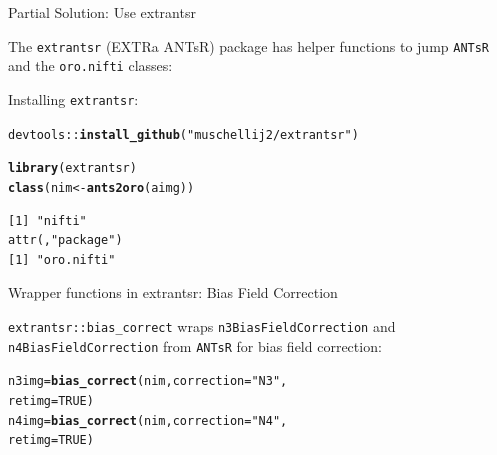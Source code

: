 \documentclass[11pt]{beamer}\usepackage[]{graphicx}\usepackage[]{color}
\makeatletter
\newcommand{\hlnum}[1]{\textcolor[rgb]{0.686,0.059,0.569}{#1}}%
\newcommand{\hlstr}[1]{\textcolor[rgb]{0.192,0.494,0.8}{#1}}%
\newcommand{\hlopt}[1]{\textcolor[rgb]{0,0,0}{#1}}%
\newcommand{\hlstd}[1]{\textcolor[rgb]{0.345,0.345,0.345}{#1}}%
\newcommand{\hlkwb}[1]{\textcolor[rgb]{0.69,0.353,0.396}{#1}}%
\newcommand{\hlkwc}[1]{\textcolor[rgb]{0.333,0.667,0.333}{#1}}%
\newcommand{\hlkwd}[1]{\textcolor[rgb]{0.737,0.353,0.396}{\textbf{#1}}}%
\newenvironment{kframe}{%
 \def\at@end@of@kframe{}%
 \ifinner\ifhmode%
  \def\at@end@of@kframe{\end{minipage}}%
  \begin{minipage}{\columnwidth}%
 \fi\fi%
 \def\FrameCommand##1{\hskip\@totalleftmargin \hskip-\fboxsep
 \colorbox{shadecolor}{##1}\hskip-\fboxsep
     \hskip-\linewidth \hskip-\@totalleftmargin \hskip\columnwidth}%
 \MakeFramed {\advance\hsize-\width
   \@totalleftmargin\z@ \linewidth\hsize
   \@setminipage}}%
 {\par\unskip\endMakeFramed%
 \at@end@of@kframe}
\newenvironment{knitrout}{}{} %
\makeatother
\begin{document}
\begin{frame}[fragile]{Partial Solution: Use extrantsr}

The \verb|extrantsr| (EXTRa ANTsR) package has helper functions to jump \verb|ANTsR| and the \verb|oro.nifti| classes:

Installing \verb|extrantsr|:
\begin{knitrout}
\color{fgcolor}\begin{kframe}
\begin{alltt}
\hlstd{devtools}\hlopt{::}\hlkwd{install_github}\hlstd{(}\hlstr{"muschellij2/extrantsr"}\hlstd{)}
\end{alltt}
\end{kframe}
\end{knitrout}
\begin{knitrout}
\color{fgcolor}\begin{kframe}
\begin{alltt}
\hlkwd{library}\hlstd{(extrantsr)}
\hlkwd{class}\hlstd{(nim} \hlkwb{<-} \hlkwd{ants2oro}\hlstd{(aimg))}
\end{alltt}
\begin{verbatim}
[1] "nifti"
attr(,"package")
[1] "oro.nifti"
\end{verbatim}
\end{kframe}
\end{knitrout}

\end{frame}


\begin{frame}[fragile]{Wrapper functions in extrantsr: Bias Field Correction}

\verb|extrantsr::bias_correct| wraps \verb|n3BiasFieldCorrection| \citep{sled1998nonparametric} and \verb|n4BiasFieldCorrection| \citep{tustison2010n4itk} from \verb|ANTsR| for bias field correction:

\begin{knitrout}
\color{fgcolor}\begin{kframe}
\begin{alltt}
\hlstd{n3img} \hlkwb{=} \hlkwd{bias_correct}\hlstd{(nim,} \hlkwc{correction} \hlstd{=} \hlstr{"N3"}\hlstd{,}
        \hlkwc{retimg}\hlstd{=}\hlnum{TRUE}\hlstd{)}
\hlstd{n4img} \hlkwb{=} \hlkwd{bias_correct}\hlstd{(nim,} \hlkwc{correction} \hlstd{=} \hlstr{"N4"}\hlstd{,}
        \hlkwc{retimg}\hlstd{=}\hlnum{TRUE}\hlstd{)}
\end{alltt}
\end{kframe}
\end{knitrout}
\end{frame}
\end{document}
